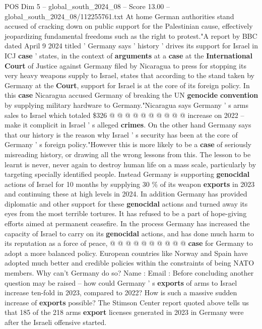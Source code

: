 \begin{textsample}{POS Dim 5 – global\_south\_2024\_08 – Score 13.00 – global\_south\_2024\_08/112255761.txt}
At home German authorities stand accused of cracking down on public support for the Palestinian cause, effectively jeopardizing fundamental freedoms such as the right to protest."A report by BBC dated April 9 2024 titled ' Germany says ' history ' drives its support for Israel in ICJ \textbf{case} ' states, in the context of \textbf{arguments} at a \textbf{case} at the \textbf{International} \textbf{Court} of Justice against Germany filed by Nicaragua to press for stopping its very heavy weapons supply to Israel, states that according to the stand taken by Germany at the \textbf{Court}, support for Israel is at the core of its foreign policy.
In this \textbf{case} Nicaragua accused Germany of breaking the UN \textbf{genocide} \textbf{convention} by supplying military hardware to Germany."Nicaragua says Germany ' s arms sales to Israel which totaled \$326 @ @ @ @ @ @ @ @ @ @ increase on 2022 -- make it complicit in Israel ' s alleged \textbf{crimes}.
On the other hand Germany says that our history is the reason why Israel ' s security has been at the core of Germany ' s foreign policy."However this is more likely to be a \textbf{case} of seriously misreading history, or drawing all the wrong lessons from this.
The lesson to be learnt is never, never again to destroy human life on a mass scale, particularly by targeting specially identified people.
Instead Germany is supporting \textbf{genocidal} actions of Israel for 10 months by supplying 30 \% of its weapon \textbf{exports} in 2023 and continuing these at high levels in 2024.
In addition Germany has provided diplomatic and other support for these \textbf{genocidal} actions and turned away its eyes from the most terrible tortures.
It has refused to be a part of hope-giving efforts aimed at permanent ceasefire.
In the process Germany has increased the capacity of Israel to carry on its \textbf{genocidal} actions, and has done much harm to its reputation as a force of peace, @ @ @ @ @ @ @ @ @ @ \textbf{case} for Germany to adopt a more balanced policy.
European countries like Norway and Spain have adopted much better and credible policies within the constraints of being NATO members.
Why can't Germany do so?
Name : Email : Before concluding another question may be raised -- how could Germany ' s \textbf{exports} of arms to Israel increase ten-fold in 2023, compared to 2022?
How is such a massive sudden increase of \textbf{exports} possible?
The Stimson Center report quoted above tells us that 185 of the 218 arms \textbf{export} licenses generated in 2023 in Germany were after the Israeli offensive started.

\end{textsample}
